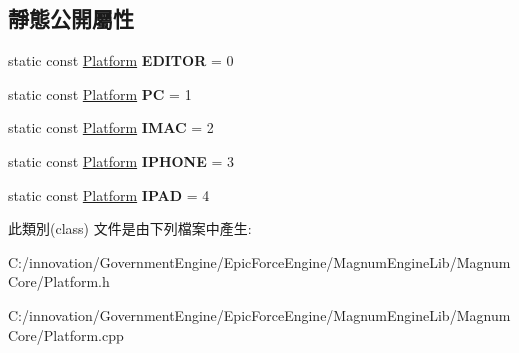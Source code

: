 \subsection*{靜態公開屬性}
\begin{DoxyCompactItemize}
\item 
static const \hyperlink{class_i_dream_sky_1_1_platform}{Platform} {\bfseries E\+D\+I\+T\+OR} = 0\hypertarget{class_i_dream_sky_1_1_platform_afcf8bc17d7e15bc2e0c08c78aed59956}{}\label{class_i_dream_sky_1_1_platform_afcf8bc17d7e15bc2e0c08c78aed59956}

\item 
static const \hyperlink{class_i_dream_sky_1_1_platform}{Platform} {\bfseries PC} = 1\hypertarget{class_i_dream_sky_1_1_platform_abe08aa08f99271d03fd6bcebf62f7685}{}\label{class_i_dream_sky_1_1_platform_abe08aa08f99271d03fd6bcebf62f7685}

\item 
static const \hyperlink{class_i_dream_sky_1_1_platform}{Platform} {\bfseries I\+M\+AC} = 2\hypertarget{class_i_dream_sky_1_1_platform_a31d667d95484ec2c2f88cef2fd1bc191}{}\label{class_i_dream_sky_1_1_platform_a31d667d95484ec2c2f88cef2fd1bc191}

\item 
static const \hyperlink{class_i_dream_sky_1_1_platform}{Platform} {\bfseries I\+P\+H\+O\+NE} = 3\hypertarget{class_i_dream_sky_1_1_platform_aff825eaa741a3bdda721cfb18efa657f}{}\label{class_i_dream_sky_1_1_platform_aff825eaa741a3bdda721cfb18efa657f}

\item 
static const \hyperlink{class_i_dream_sky_1_1_platform}{Platform} {\bfseries I\+P\+AD} = 4\hypertarget{class_i_dream_sky_1_1_platform_aea05cf2f886a77a639db36689c030fb5}{}\label{class_i_dream_sky_1_1_platform_aea05cf2f886a77a639db36689c030fb5}

\end{DoxyCompactItemize}


此類別(class) 文件是由下列檔案中產生\+:\begin{DoxyCompactItemize}
\item 
C\+:/innovation/\+Government\+Engine/\+Epic\+Force\+Engine/\+Magnum\+Engine\+Lib/\+Magnum\+Core/Platform.\+h\item 
C\+:/innovation/\+Government\+Engine/\+Epic\+Force\+Engine/\+Magnum\+Engine\+Lib/\+Magnum\+Core/Platform.\+cpp\end{DoxyCompactItemize}
